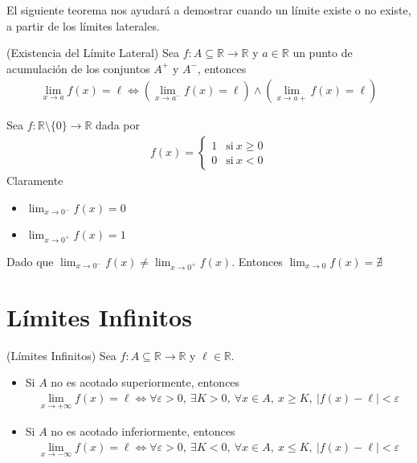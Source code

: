 \documentclass[12pt]{book}
\begin{document}
El siguiente teorema nos ayudará a demostrar cuando un límite existe o no existe, a partir de los límites laterales.

\begin{teo}{(Existencia del Límite Lateral)}{}
    Sea $f: A \subseteq \mathbb{R}\to \mathbb{R}$ y $a \in \mathbb{R}$ un punto de acumulación de los conjuntos $A^+$ y $A^-$, entonces 
    \begin{align*}
        \lim_{x\to a }f(x)=\ell \Longleftrightarrow \left( \lim_{x\to a^-}f(x)=\ell\right) \wedge \left(\lim_{x \to a+}f(x)=\ell \right)
    \end{align*}
\end{teo}

\begin{eje}{}{}
    Sea $f: \mathbb{R}\setminus\{0\} \to \mathbb{R}$ dada por 
    \begin{align*}
        f(x)=\begin{cases}
            1 &\text{si}\  x \geq0 \\
            0 &\text{si} \ x< 0
        \end{cases}
    \end{align*}
    Claramente 
    \begin{itemize}
        \item $\displaystyle \lim_{x\to0^-}f(x)=0$
        \item $\displaystyle \lim_{x\to 0^+}f(x)=1$
    \end{itemize}
    Dado que $\displaystyle \lim_{x\to0^-}f(x)\neq \lim_{x\to 0^+}f(x)$. Entonces $\displaystyle \lim_{x\to 0}f(x)=\nexists$
\end{eje}

\section{Límites Infinitos}

\begin{defi}{(Límites Infinitos)}{}
    Sea $f:A \subseteq \mathbb{R} \to \mathbb{R}$ y $\ell \in \mathbb{R}$.

    \begin{itemize}
        \item Si $A$ no es acotado superiormente, entonces
        \begin{align*}
            \lim_{x \to +\infty}f(x)=\ell \Longleftrightarrow \forall \varepsilon>0, \ \exists K >0, \ \forall x \in A ,  \ x \geq K, \ |f(x)-\ell| <\varepsilon
        \end{align*}

        \item Si $A$ no es acotado inferiormente, entonces
        \begin{align*}
             \lim_{x \to -\infty}f(x)=\ell \Longleftrightarrow \forall \varepsilon>0, \ \exists K <0, \ \forall x \in A ,  \ x \leq K, \ |f(x)-\ell| <\varepsilon
        \end{align*}
    \end{itemize}
\end{defi}
\end{document}
